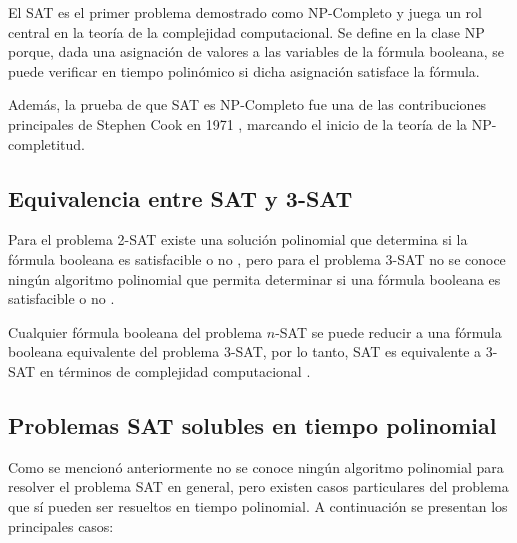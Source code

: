 \documentclass[12pt]{article}
\begin{document}
El SAT es el primer problema demostrado como NP-Completo \cite{authomataTheory} y juega un rol central en la teoría de la complejidad computacional. Se define en la clase NP porque, dada una asignación de valores a las variables de la fórmula booleana, se puede verificar en tiempo polinómico si dicha asignación satisface la fórmula.

Además, la prueba de que SAT es NP-Completo fue una de las contribuciones principales de Stephen Cook en 1971 \cite{authomataTheory}, marcando el inicio de la teoría de la NP-completitud.

\subsection{Equivalencia entre SAT y 3-SAT}

Para el problema 2-SAT existe una solución polinomial que determina si la fórmula booleana es satisfacible o no \cite{geeksforgeeks_2sat}, pero para el problema 3-SAT no se conoce ningún algoritmo polinomial que permita
determinar si una fórmula booleana es satisfacible o no \cite{authomataTheory}.

Cualquier fórmula booleana del problema $n$-SAT se puede reducir a una fórmula booleana equivalente del problema 3-SAT, 
por lo tanto, SAT es equivalente a 3-SAT en términos de complejidad computacional \cite{authomataTheory}.

\subsection{Problemas SAT solubles en tiempo polinomial}

Como se mencionó anteriormente no se conoce ningún algoritmo polinomial para resolver el problema SAT en general, pero
existen casos particulares del problema que sí pueden ser resueltos en tiempo polinomial. A continuación se presentan los
principales casos:
\end{document}
